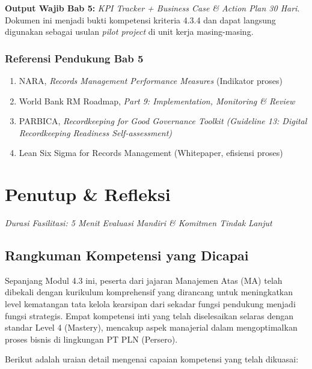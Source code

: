 \documentclass[12pt,a4paper]{report}
\begin{document}
\begin{outputbox}
\textbf{Output Wajib Bab 5:} \textit{KPI Tracker + Business Case \& Action Plan 30 Hari}. Dokumen ini menjadi bukti kompetensi kriteria 4.3.4 dan dapat langsung digunakan sebagai usulan \textit{pilot project} di unit kerja masing-masing.
\end{outputbox}

\subsection*{Referensi Pendukung Bab 5}
\begin{enumerate}[leftmargin=*, nosep]
    \item NARA, \textit{Records Management Performance Measures} (Indikator proses)
    \item World Bank RM Roadmap, \textit{Part 9: Implementation, Monitoring \& Review}
    \item PARBICA, \textit{Recordkeeping for Good Governance Toolkit (Guideline 13: Digital Recordkeeping Readiness Self-assessment)}
    \item Lean Six Sigma for Records Management (Whitepaper, efisiensi proses)
\end{enumerate}

\newpage
\chapter{Penutup \& Refleksi}
\textit{Durasi Fasilitasi: 5 Menit} \quad \textit{Evaluasi Mandiri \& Komitmen Tindak Lanjut}

\section{Rangkuman Kompetensi yang Dicapai}
Sepanjang Modul 4.3 ini, peserta dari jajaran Manajemen Atas (MA) telah dibekali dengan kurikulum komprehensif yang dirancang untuk meningkatkan level kematangan tata kelola kearsipan dari sekadar fungsi pendukung menjadi fungsi strategis. Empat kompetensi inti yang telah diselesaikan selaras dengan standar Level 4 (Mastery), mencakup aspek manajerial dalam mengoptimalkan proses bisnis di lingkungan PT PLN (Persero).

Berikut adalah uraian detail mengenai capaian kompetensi yang telah dikuasai:
\end{document}
